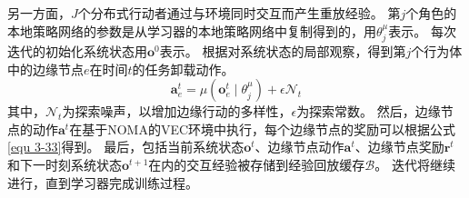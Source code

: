另一方面，$J$个分布式行动者通过与环境同时交互而产生重放经验。
第$j$个角色的本地策略网络的参数是从学习器的本地策略网络中复制得到的，用$\theta^{\mu}_{j}$表示。
每次迭代的初始化系统状态用$\boldsymbol{o}^{0}$表示。
根据对系统状态的局部观察，得到第$j$个行为体中的边缘节点$e$在时间$t$的任务卸载动作。
\begin{equation}
	\boldsymbol{a}_{e}^{t}={\mu}\left(\boldsymbol{o}_{e}^{t} \mid \theta^{\mu}_{j}\right)+\epsilon  \mathcal{N}_{t}
\end{equation}
\noindent 其中，$\mathcal{N}_{t}$为探索噪声，以增加边缘行动的多样性，$\epsilon$为探索常数。
然后，边缘节点的动作$\boldsymbol{a}^{t}$在基于NOMA的VEC环境中执行，每个边缘节点的奖励可以根据公式\ref{equ 3-33}得到。
最后，包括当前系统状态$\boldsymbol{o}^{t}$、边缘节点动作$\boldsymbol{a}^{t}$、边缘节点奖励$\boldsymbol{r}^{t}$和下一时刻系统状态$\boldsymbol{o}^{t+1}$在内的交互经验被存储到经验回放缓存$\mathcal{B}$。
迭代将继续进行，直到学习器完成训练过程。

